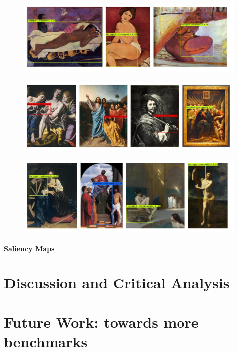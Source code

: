 \begin{figure}[ht!]
\centering
  \includegraphics[width=\linewidth]{./Images/Chapter05/false_positives_1}
  \caption{}
  \label{fig:false_positives_1}
\end{figure}


\begin{figure}[ht!]
\centering
  \includegraphics[width=\linewidth]{./Images/Chapter05/false_positives_2}
  \caption{}
  \label{fig:false_positives_2}
\end{figure}


\begin{figure}[ht!]
\centering
  \includegraphics[width=\linewidth]{./Images/Chapter05/false_positives_3}
  \caption{}
  \label{fig:false_positives_3}
\end{figure}



\paragraph{Saliency Maps}






\section{Discussion and Critical Analysis}
\label{sec:discussion}






\section{Future Work: towards more benchmarks}
\label{sec:future_work}
